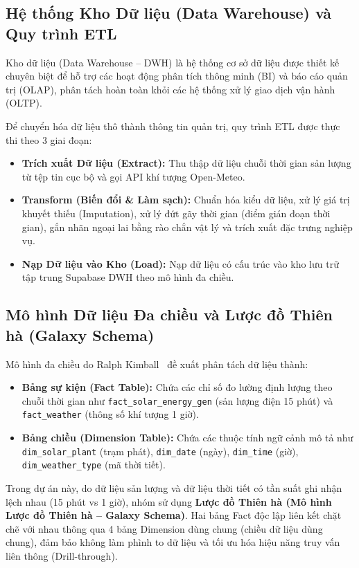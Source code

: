 \subsection{Hệ thống Kho Dữ liệu (Data Warehouse) và Quy trình ETL}
Kho dữ liệu (Data Warehouse -- DWH) là hệ thống cơ sở dữ liệu được thiết kế chuyên biệt để hỗ trợ các hoạt động phân tích thông minh (BI) và báo cáo quản trị (OLAP), phân tách hoàn toàn khỏi các hệ thống xử lý giao dịch vận hành (OLTP).

Để chuyển hóa dữ liệu thô thành thông tin quản trị, quy trình ETL được thực thi theo 3 giai đoạn:
\begin{itemize}[noitemsep]
    \item \textbf{Trích xuất Dữ liệu (Extract):} Thu thập dữ liệu chuỗi thời gian sản lượng từ tệp tin cục bộ và gọi API khí tượng Open-Meteo.
    \item \textbf{Transform (Biến đổi \& Làm sạch):} Chuẩn hóa kiểu dữ liệu, xử lý giá trị khuyết thiếu (Imputation), xử lý đứt gãy thời gian (điểm gián đoạn thời gian), gắn nhãn ngoại lai bằng rào chắn vật lý và trích xuất đặc trưng nghiệp vụ.
    \item \textbf{Nạp Dữ liệu vào Kho (Load):} Nạp dữ liệu có cấu trúc vào kho lưu trữ tập trung Supabase DWH theo mô hình đa chiều.
\end{itemize}

\subsection{Mô hình Dữ liệu Đa chiều và Lược đồ Thiên hà (Galaxy Schema)}
Mô hình đa chiều do Ralph Kimball~\cite{kimball2013dwh} đề xuất phân tách dữ liệu thành:
\begin{itemize}[noitemsep]
    \item \textbf{Bảng sự kiện (Fact Table):} Chứa các chỉ số đo lường định lượng theo chuỗi thời gian như \texttt{fact\_solar\_energy\_gen} (sản lượng điện 15 phút) và \texttt{fact\_weather} (thông số khí tượng 1 giờ).
    \item \textbf{Bảng chiều (Dimension Table):} Chứa các thuộc tính ngữ cảnh mô tả như \texttt{dim\_solar\_plant} (trạm phát), \texttt{dim\_date} (ngày), \texttt{dim\_time} (giờ), \texttt{dim\_weather\_type} (mã thời tiết).
\end{itemize}

Trong dự án này, do dữ liệu sản lượng và dữ liệu thời tiết có tần suất ghi nhận lệch nhau (15 phút vs 1 giờ), nhóm sử dụng \textbf{Lược đồ Thiên hà (Mô hình Lược đồ Thiên hà -- Galaxy Schema)}. Hai bảng Fact độc lập liên kết chặt chẽ với nhau thông qua 4 bảng Dimension dùng chung (chiều dữ liệu dùng chung), đảm bảo không làm phình to dữ liệu và tối ưu hóa hiệu năng truy vấn liên thông (Drill-through).

